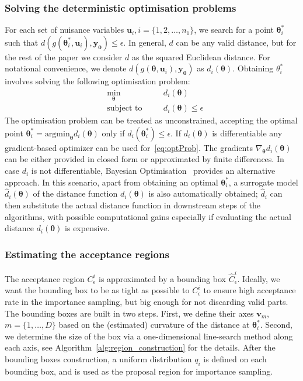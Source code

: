 \documentclass[article]{jss}
\newcommand{\ub}{\mathbf{u}}
\newcommand{\thetab}{\boldsymbol{\theta}}
\newcommand{\simulator}{g}
\newcommand{\data}{\mathbf{y_0}}
\newcommand{\accregioni}{C^i_{\epsilon}}
\newcommand{\accregionihat}{\hat{C}^i_{\epsilon}}
\begin{document}
\subsubsection*{Solving the deterministic optimisation problems}
For each set of nuisance variables \(\ub_i, i = \{1,2,\ldots,n_1 \}\),
we search for a point \(\thetab^*_i\) such that
\(d(\simulator(\thetab^*_i,\ub_i), \data) \le \epsilon\). In general,
\(d\) can be any valid distance, but for the rest of the paper we
consider \(d\) as the squared Euclidean distance. For notational
convenience, we denote \(d(\simulator(\thetab,\ub_i), \data)\) as
\(d_i(\thetab)\).  Obtaining \(\theta_i^*\) involves solving the
following optimisation problem:
\begin{subequations}
\begin{alignat}{2}
  &\!\min_{\thetab}        && d_i(\thetab) \label{eq:optProb}\\
  &\text{subject to} & \quad& d_i(\thetab) \leq \epsilon
\end{alignat}
\end{subequations}
%
The optimisation problem can be treated as unconstrained, accepting
the optimal point
\(\thetab_i^* = \text{argmin}_{\thetab} d_i(\thetab)\) only if
\(d_i(\thetab_i^*) \le \epsilon\). If \(d_i(\thetab)\) is
differentiable any gradient-based optimizer can be used
for~\ref{eq:optProb}. The gradients \(\nabla_{\thetab} d_i(\thetab)\)
can be either provided in closed form or approximated by finite
differences. In case \(d_i\) is not differentiable, Bayesian
Optimisation~\citep{Shahriari2016} provides an alternative
approach. In this scenario, apart from obtaining an optimal
\(\thetab_i^* \), a surrogate model \(\hat{d}_i(\thetab)\) of the
distance function \(d_i(\thetab)\) is also automatically obtained;
\(\hat{d}_i\) can then substitute the actual distance function in
downstream steps of the algorithms, with possible computational gains
especially if evaluating the actual distance \(d_i(\thetab)\) is
expensive.

\subsubsection*{Estimating the acceptance regions}
The acceptance region \(\accregioni\) is approximated by a bounding
box \(\accregionihat\). Ideally, we want the bounding box to be as
tight as possible to \(\accregioni\) to ensure high acceptance rate in
the importance sampling, but big enough for not discarding valid
parts. The bounding boxes are built in two steps. First, we define
their axes \(\mathbf{v}_m\), \(m = \{1, \ldots, D\}\) based on the
(estimated) curvature of the distance at \(\thetab_i^*\). Second, we
determine the size of the box via a one-dimensional line-search method
along each axis, see Algorithm~\ref{alg:region_construction} for the
details. After the bounding boxes construction, a uniform distribution
\(q_i\) is defined on each bounding box, and is used as the proposal
region for importance sampling.
\end{document}
